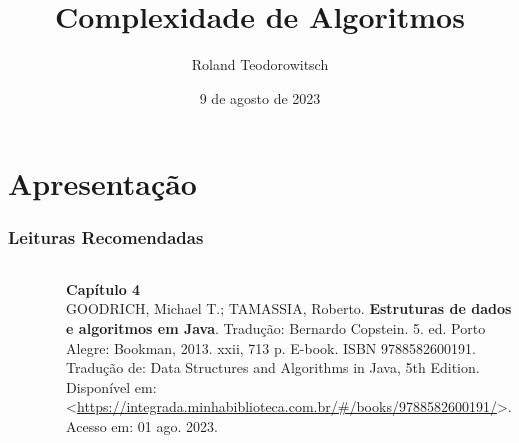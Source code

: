 \documentclass[aspectratio=169]{beamer}
\title[\sc{Complexidade de Algoritmos}]{Complexidade de Algoritmos}
\author[Roland Teodorowitsch]{Roland Teodorowitsch}
\institute[ALEST I - EP - PUCRS]{Algoritmos e Estruturas de Dados I - Escola Politécnica - PUCRS}
\date{9 de agosto de 2023}
\begin{document}
\justifying

\begin{frame}
	\titlepage
\end{frame}

\section{Apresentação}

\begin{frame}\frametitle{Leituras Recomendadas}

\begin{columns}[T]
\begin{column}{0.15\linewidth}
\vspace{-3mm}
\begin{figure}[h]
	\centering
	\includegraphics[height=0.3\paperheight]{imagens/livro_goodrich.jpg}
\end{figure}
\end{column}
\begin{column}{0.85\linewidth}
\vspace{3mm}
\textbf{Capítulo 4}\\
\scriptsize{GOODRICH, Michael T.; TAMASSIA, Roberto. \textbf{Estruturas de dados e algoritmos em Java}. Tradução: Bernardo Copstein. 5. ed. Porto Alegre: Bookman, 2013. xxii, 713 p. E-book. ISBN 9788582600191. Tradução de: Data Structures and Algorithms in Java, 5th Edition. Disponível em: \textless{}\url{https://integrada.minhabiblioteca.com.br/\#/books/9788582600191/}\textgreater{}. Acesso em: 01 ago. 2023.}
\end{column}
\end{columns}

\vspace{5mm}


\end{frame}
\end{document}
